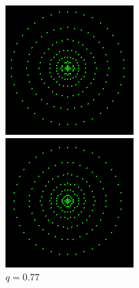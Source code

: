 \documentclass[11pt]{article}
\begin{document}
            \begin{figure}[ht]
                \centering
                \begin{subcaptionblock}{.333\textwidth}
                    \centering
                    \includegraphics[width=\textwidth]{fotos/parte 1/Aberraciones/Aberración Esférica/52.png}
                    \caption{$q=0.77$}
                \end{subcaptionblock}%
                \begin{subcaptionblock}{.333\textwidth}
                    \centering
                    \includegraphics[width=\textwidth]{fotos/parte 1/Aberraciones/Aberración Esférica/58.png}

\end{subcaptionblock}
\end{figure}
\end{document}
